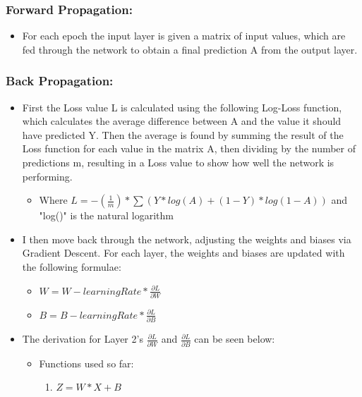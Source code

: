 \documentclass[./project-report/src/latex/project-report.tex]{subfiles}
\begin{document}
\subsubsection{Forward Propagation:}

\begin{itemize}
    \item For each epoch the input layer is given a matrix of input values, which are fed through the network to obtain a final prediction A from the output layer.
\end{itemize}

\subsubsection{Back Propagation:}

\begin{itemize}
    \item First the Loss value L is calculated using the following Log-Loss function, which calculates the average difference between A and the value it should have 
          predicted Y. Then the average is found by summing the result of the Loss function for each value in the matrix A, then dividing by the number of predictions m, 
          resulting in a Loss value to show how well the network is performing.
    \begin{itemize}
        \item Where $L = -(\frac{1}{m}) * \sum(Y * log(A) + (1-Y) * log(1-A))$ and "log()" is the natural logarithm
    \end{itemize}
    \item I then move back through the network, adjusting the weights and biases via Gradient Descent. For each layer, the weights and biases are updated with the 
          following formulae:
    \begin{itemize}
        \item $W = W - learningRate * \frac{\partial{L}}{\partial{W}}$
        \item $B = B - learningRate * \frac{\partial{L}}{\partial{B}}$
    \end{itemize}
    \item The derivation for Layer 2's $\frac{\partial{L}}{\partial{W}}$ and $\frac{\partial{L}}{\partial{B}}$ can be seen below:
    \begin{itemize}
        \item Functions used so far:
        \begin{enumerate}
            \item $Z = W * X + B$

\end{enumerate}
\end{itemize}
\end{itemize}
\end{document}
